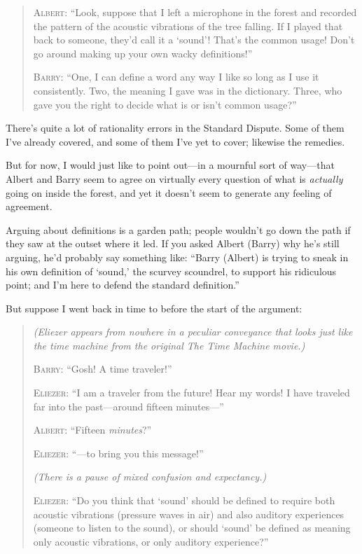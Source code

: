 {\begin{quotation}
 \textsc{Albert}: ``Look, suppose that I left a microphone
in the forest and recorded the pattern of the acoustic vibrations of
the tree falling. If I played that back to someone,
they'd call it a
`sound'! That's the
common usage! Don't go around making up your own wacky
definitions!''

{
 \textsc{Barry}: ``One, I can define a word any way I like
so long as I use it consistently. Two, the meaning I gave was in the
dictionary. Three, who gave you the right to decide what is or
isn't common usage?''}
\end{quotation}


 There's quite a lot of rationality errors in the
Standard Dispute. Some of them I've already covered,
and some of them I've yet to cover; likewise the
remedies.


 But for now, I would just like to point out---in a mournful sort
of way---that Albert and Barry seem to agree on virtually every
question of what is \textit{actually} going on inside the forest, and
yet it doesn't seem to generate any feeling of
agreement.


 Arguing about definitions is a garden path; people
wouldn't go down the path if they saw at the outset
where it led. If you asked Albert (Barry) why he's
still arguing, he'd probably say something like:
``Barry (Albert) is trying to sneak in his own
definition of `sound,' the scurvey
scoundrel, to support his ridiculous point; and I'm
here to defend the standard definition.''


 But suppose I went back in time to before the start of the
argument:

\begin{quotation}
{
 \textit{(Eliezer appears from nowhere in a peculiar conveyance
that looks just like the time machine from the original The Time
Machine movie.)}}


 \textsc{Barry}: ``Gosh! A time
traveler!''


 \textsc{Eliezer}: ``I am a traveler from the future! Hear
my words! I have traveled far into the past---around fifteen
minutes---''


 \textsc{Albert}: ``Fifteen
\textit{minutes}?''


 \textsc{Eliezer}: ``---to bring you this
message!''


 \textit{(There is a pause of mixed confusion and expectancy.)}


 \textsc{Eliezer}: ``Do you think that
`sound' should be defined to require
both acoustic vibrations (pressure waves in air) and also auditory
experiences (someone to listen to the sound), or should
`sound' be defined as meaning only
acoustic vibrations, or only auditory experience?''



\end{quotation}}
